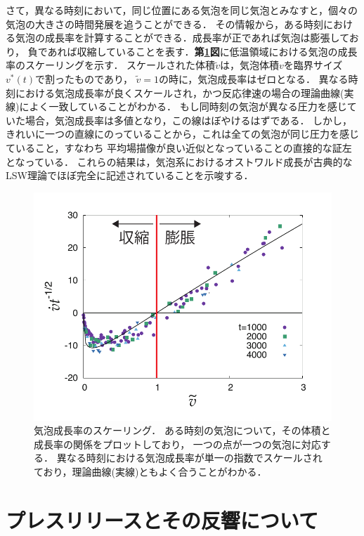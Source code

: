 \documentclass[topics,b5paper,papersize,twocolumn]{jsarticle}
\begin{document}
さて，異なる時刻において，同じ位置にある気泡を同じ気泡とみなすと，個々の気泡の大きさの時間発展を追うことができる．
その情報から，ある時刻における気泡の成長率を計算することができる．成長率が正であれば気泡は膨張しており，
負であれば収縮していることを表す．\textbf{第\ref{fig_vdot}図}に低温領域における気泡の成長率のスケーリングを示す\cite{Watanabe2016}．
スケールされた体積$\tilde{v}$は，気泡体積$v$を臨界サイズ$v^*(t)$で割ったものであり，
$\tilde{v} = 1$の時に，気泡成長率はゼロとなる．
異なる時刻における気泡成長率が良くスケールされ，かつ反応律速の場合の理論曲線(実線)によく一致していることがわかる．
もし同時刻の気泡が異なる圧力を感じていた場合，気泡成長率は多値となり，この線はぼやけるはずである．
しかし，きれいに一つの直線にのっていることから，これは全ての気泡が同じ圧力を感じていること，すなわち
平均場描像が良い近似となっていることの直接的な証左となっている．
これらの結果は，気泡系におけるオストワルド成長が古典的なLSW理論でほぼ完全に記述されていることを示唆する．

\begin{figure}[tb]
\centering
\includegraphics[width=0.9\linewidth]{vdot.pdf}
\caption{
気泡成長率のスケーリング．
ある時刻の気泡について，その体積と成長率の関係をプロットしており，
一つの点が一つの気泡に対応する．
異なる時刻における気泡成長率が単一の指数でスケールされており，理論曲線(実線)ともよく合うことがわかる\cite{Watanabe2016}．
}\label{fig_vdot}
\end{figure}

\section{プレスリリースとその反響について}
\end{document}
